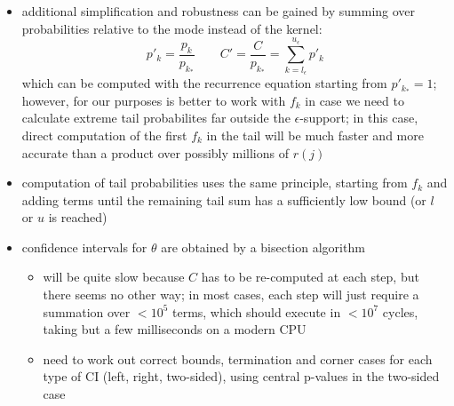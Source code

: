 \documentclass[a4paper]{article}
\begin{document}
\begin{itemize}
\item additional simplification and robustness can be gained by summing over probabilities relative to the mode instead of the kernel:
  \[
    p'_k = \frac{p_k}{p_{k_*}} \qquad
    C' = \frac{C}{p_{k_*}} = \sum_{k = l_{\epsilon}}^{u_{\epsilon}} p'_k
  \]
  which can be computed with the recurrence equation starting from $p'_{k_*} = 1$; however, for our purposes is better to work with $f_k$ in case we need to calculate extreme tail probabilites far outside the $\epsilon$-support; in this case, direct computation of the first $f_k$ in the tail will be much faster and more accurate than a product over possibly millions of $r(j)$
\item computation of tail probabilities uses the same principle, starting from $f_k$ and adding terms until the remaining tail sum has a sufficiently low bound (or $l$ or $u$ is reached)
\item confidence intervals for $\theta$ are obtained by a bisection algorithm
  \begin{itemize}
  \item will be quite slow because $C$ has to be re-computed at each step, but there seems no other way; in most cases, each step will just require a summation over $< 10^5$ terms, which should execute in $< 10^7$ cycles, taking but a few milliseconds on a modern CPU
  \item need to work out correct bounds, termination and corner cases for each type of CI (left, right, two-sided), using central p-values in the two-sided case
  \end{itemize}
\end{itemize}


\subsection{}
\label{sec:fisher:}






  

\newpage
\listoftodos %
\end{document}
